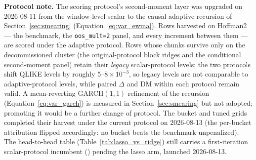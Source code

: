 \textbf{Protocol note.}\label{app:protocol_note} The scoring protocol's second-moment layer was
upgraded on 2026-08-11 from the window-level scalar to the causal
adaptive recursion of Section~\ref{sec:smearing}
(Equation~\eqref{eq:var_ewma}). Rows harvested on Hoffman2 --- the
benchmark, the \texttt{oos\_mult=2} panel, and every increment between
them --- are scored under the adaptive protocol. Rows whose chunks
survive only on the decommissioned cluster (the original-protocol
block ridges and the conditional second-moment panel) retain their
\emph{legacy} scalar-protocol levels; the two protocols shift QLIKE
levels by roughly $5$--$8 \times 10^{-3}$, so legacy levels are not
comparable to adaptive-protocol levels, while paired $\Delta$ and DM
within each protocol remain valid. A mean-reverting GARCH$(1,1)$
refinement of the recursion (Equation~\eqref{eq:var_garch}) is
measured in Section~\ref{sec:smearing} but not adopted; promoting it
would be a further change of protocol. The bucket and tuned grids
completed their harvest under the current protocol on 2026-08-13 (the
per-bucket attribution flipped accordingly: no bucket beats the
benchmark unpenalized). The head-to-head table
(Table~\ref{tab:lasso_vs_ridge}) still carries a first-iteration
scalar-protocol incumbent (\unifAzeroQLIKEScalar{}) pending the lasso
arm, launched 2026-08-13.
\fi

